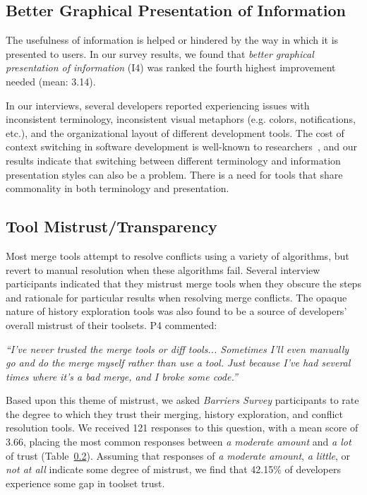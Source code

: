 \subsection{Better Graphical Presentation of Information}
The usefulness of information is helped or hindered by the way in which it is presented to users.
In our survey results, we found that \textit{better graphical presentation of information} (I4) was ranked the fourth highest improvement needed (mean: 3.14).

In our interviews, several developers reported experiencing issues with inconsistent terminology, inconsistent visual metaphors (e.g. colors, notifications, etc.), and the organizational layout of different development tools.
The cost of context switching in software development is well-known to researchers~\cite{czerwinski2004taskswitching, li2007cost_of_context_switch, blackwell2002attentioninvestment, convertino2003dualview}, and our results indicate that switching between different terminology and information presentation styles can also be a problem.
There is a need for tools that share commonality in both terminology and presentation. 

\subsection{Tool Mistrust/Transparency}\label{tool_trust}
Most merge tools attempt to resolve conflicts using a variety of algorithms, but revert to manual resolution when these algorithms fail.
Several interview participants indicated that they mistrust merge tools when they obscure the steps and rationale for particular results when resolving merge conflicts.
The opaque nature of history exploration tools was also found to be a source of developers' overall mistrust of their toolsets.
P4 commented:
\begin{quoting}
\textit{``I've never trusted the merge tools or diff tools... Sometimes I'll even manually go and do the merge myself rather than use a tool. Just because I've had several times where it's a bad merge, and I broke some code.''}
\end{quoting}

Based upon this theme of mistrust, we asked \textit{Barriers Survey} participants to rate the degree to which they trust their merging, history exploration, and conflict resolution tools.
We received 121 responses to this question, with a mean score of 3.66, placing the most common responses between \textit{a moderate amount} and \textit{a lot} of trust (Table~\ref{tool_trust}).
Assuming that responses of \textit{a moderate amount}, \textit{a little}, or \textit{not at all} indicate some degree of mistrust, we find that 42.15\% of developers experience some gap in toolset trust.

